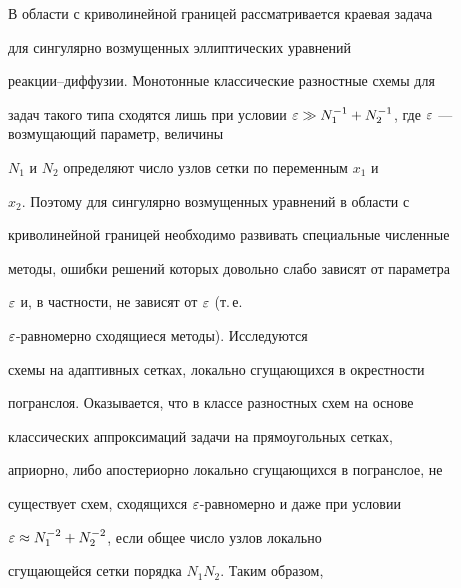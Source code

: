 \date{}




\pagestyle{plain} %







\maketitle


\label{begin}








В области с криволинейной границей рассматривается краевая задача


для сингулярно возмущенных эллиптических уравнений


реакции--диффузии. Монотонные классические разностные схемы для


задач такого типа сходятся лишь при условии $\eps\gg


N_1^{-1}+N_2^{-1}$, где $\eps$ --- возмущающий параметр, величины


$N_1$ и $N_2$ определяют число узлов сетки по переменным $x_1$ и


$x_2$. Поэтому для сингулярно возмущенных уравнений в области с


криволинейной границей необходимо развивать специальные численные


методы, ошибки решений которых довольно слабо зависят от параметра


$\varepsilon$ и, в частности, не зависят от $\varepsilon$  (т.\,е.


$\varepsilon$-равномерно сходящиеся методы). Исследуются


схемы на адаптивных сетках, локально сгущающихся в окрестности


погранслоя. Оказывается, что в классе разностных схем на основе


классических аппроксимаций задачи на прямоугольных сетках,


априорно, либо апостериорно локально сгущающихся в погранслое, не


существует схем, сходящихся $\varepsilon$-равномерно и даже при условии


$\varepsilon\approx N_1^{-2}+N_2^{-2}$, если общее число узлов локально


сгущающейся сетки порядка $N_1N_2$. Таким образом,


